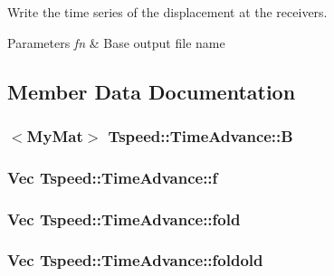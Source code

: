 Write the time series of the displacement at the receivers. 


\begin{DoxyParams}{Parameters}
{\em fn} & Base output file name \\
\hline
\end{DoxyParams}


\subsection{Member Data Documentation}
\hypertarget{classTspeed_1_1TimeAdvance_a10e673f4de9933dec049cb65261314ad}{
\subsubsection[{B}]{$<${\bf My\-Mat}$>$ Tspeed\-::\-Time\-Advance\-::\-B\hspace{0.3cm}{\ttfamily [protected]}}}\label{classTspeed_1_1TimeAdvance_a10e673f4de9933dec049cb65261314ad}
\hypertarget{classTspeed_1_1TimeAdvance_a36dea2ae6ba03546806bbacb83697c01}{
\subsubsection[{f}]{\setlength{\rightskip}{0pt plus 5cm}Vec Tspeed\-::\-Time\-Advance\-::f\hspace{0.3cm}{\ttfamily [protected]}}}\label{classTspeed_1_1TimeAdvance_a36dea2ae6ba03546806bbacb83697c01}
\hypertarget{classTspeed_1_1TimeAdvance_a3cfbea04f0116183c5ac4ec59282d3e8}{
\subsubsection[{fold}]{\setlength{\rightskip}{0pt plus 5cm}Vec Tspeed\-::\-Time\-Advance\-::fold\hspace{0.3cm}{\ttfamily [protected]}}}\label{classTspeed_1_1TimeAdvance_a3cfbea04f0116183c5ac4ec59282d3e8}
\hypertarget{classTspeed_1_1TimeAdvance_aac8169dc52fa2b5f00c87328707b9b26}{
\subsubsection[{foldold}]{\setlength{\rightskip}{0pt plus 5cm}Vec Tspeed\-::\-Time\-Advance\-::foldold\hspace{0.3cm}{\ttfamily [protected]}}}\label{classTspeed_1_1TimeAdvance_aac8169dc52fa2b5f00c87328707b9b26}
